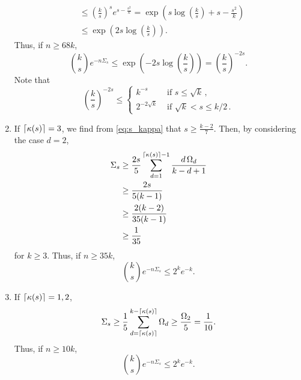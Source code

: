 \documentclass[11pt,onecolumn]{IEEEtran}
\newcommand{\beq}{\begin{equation}}
\newcommand{\eeq}{\end{equation}}
\DeclarePairedDelimiter\ceil{\lceil}{\rceil}
\begin{document}
\begin{enumerate}
\begin{equation*}
\begin{split}
&\leq \left( \frac{k}{s} \right)^s e^{s-\frac{s^2}{k}} = \exp \left( s \log \left( \frac{k}{s} \right) + s - \frac{s^2}{k} \right) \\
&\leq \exp \left( 2s \log \left( \frac{k}{s} \right) \right).
\end{split} \end{equation*}
Thus, if $n \geq 68k$,
$$
\binom{k}{s} e^{-n\Sigma_s} \leq \exp \left( -2s \log \left( \frac{k}{s} \right) \right) = \left( \frac{k}{s} \right)^{-2s}.
$$
Note that
$$
\left( \frac{k}{s} \right)^{-2s} \leq
	\begin{cases}
	k^{-s} & \text{ if } s \leq \sqrt k \,, \\
	2^{-2\sqrt k} &\text{ if } \sqrt k < s \leq k/2 \,.
	\end{cases}
$$
\item If $\ceil*{\kappa(s)} = 3$, we find from \eqref{eq:s_kappa} that $s \geq \frac{k-2}{7}$. Then, by considering the case $d=2$,
\beq\nonumber
\begin{aligned}
\Sigma_s &\geq \frac{2s}{5} \sum_{d=1}^{\ceil*{\kappa(s)}-1} \frac{d\,\Omega_d}{k-d+1}\\
& \geq \frac{2s}{5(k-1)}\\
& \geq \frac{2(k-2)}{35(k-1)} \\
&\geq \frac{1}{35}
\end{aligned}
\eeq
for $k \geq 3$. Thus, if $n \geq 35k$,
$$
\binom{k}{s} e^{-n\Sigma_s} \leq 2^k e^{-k}.
$$

\item If $\ceil*{\kappa(s)} = 1, 2$,
$$
\Sigma_s \geq \frac{1}{5} \sum_{d=\ceil*{\kappa(s)}}^{k-\ceil*{\kappa(s)}} \Omega_d \geq \frac{\Omega_2}{5} = \frac{1}{10}.
$$
Thus, if $n \geq 10k$,
$$
\binom{k}{s} e^{-n\Sigma_s} \leq 2^k e^{-k}.
$$
\end{enumerate}
\end{document}

